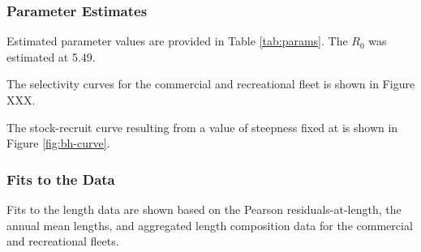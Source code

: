 \documentclass[11pt,
  english,
  a4paper,
]{article}
\begin{document}
\leavevmode\tagmcend\tagstructend\par


\hypertarget{parameter-estimates}{%
\subsubsection{Parameter Estimates}\label{parameter-estimates}}

\leavevmode\tagmcend\tagstructend


Estimated parameter values are provided in Table \ref{tab:params}. The {\(R_0\)\leavevmode\tagmcend\tagstructend} was estimated at 5.49.

\leavevmode\tagmcend\tagstructend\par


The selectivity curves for the commercial and recreational fleet is shown in Figure XXX.

\leavevmode\tagmcend\tagstructend\par


The stock-recruit curve resulting from a value of steepness fixed at is shown in Figure \ref{fig:bh-curve}.

\leavevmode\tagmcend\tagstructend\par


\hypertarget{fits-to-the-data}{%
\subsubsection{Fits to the Data}\label{fits-to-the-data}}

\leavevmode\tagmcend\tagstructend


Fits to the length data are shown based on the Pearson residuals-at-length, the annual mean lengths, and aggregated length composition data for the commercial and recreational fleets.

\leavevmode\tagmcend\tagstructend\par

\end{document}
